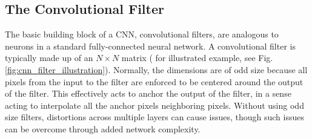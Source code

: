 \subsection{The Convolutional Filter}

% 
% 
The basic building block of a \ac{CNN}, convolutional 
filters, are analogous to neurons in a standard fully-connected 
neural network. A convolutional filter is typically made up of 
an $N \times N$ matrix ( for illustrated 
example, see Fig.\ref{fig:cnn_filter_illustration}). Normally, 
the dimensions are of odd size because all pixels from the input 
to the filter are enforced to be centered around the output 
of the filter. This effectively acts to anchor the output 
of the filter, in a sense acting to interpolate all 
the anchor pixels neighboring pixels. Without using odd size filters, distortions 
across multiple layers can cause issues, though such issues can be overcome through 
added network complexity.

